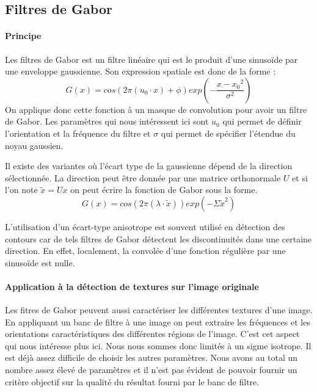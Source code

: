 \documentclass{article}
\begin{document}
\subsection{Filtres de Gabor}

\paragraph{Principe}

Les filtres de Gabor  est un filtre linéaire qui est le produit d'une sinusoïde 
par une enveloppe gaussienne. Son expression spatiale est donc de la forme :
$$ G(x)= cos(2 \pi (u_0 \cdot x) + \phi) exp\left(-\frac{{x-x_0}^2}{\sigma^2}\right) $$
On applique donc cette fonction à un masque de convolution pour avoir un filtre de Gabor.
Les paramètres qui nous intéressent ici sont $u_0$ qui permet de définir l'orientation et la fréquence du filtre et $\sigma$ qui permet de spécifier l'étendue du noyau gaussien. 

Il existe des variantes où l'écart type de la gaussienne dépend de la direction sélectionnée. 
La direction peut être donnée par une matrice orthonormale $U$ et si l'on note $\tilde{x} = U x$ on peut écrire la fonction de Gabor sous la forme.
$$ G(x)= cos(2 \pi (\lambda \cdot \tilde{x}) ) exp\left(- {\Sigma \tilde{x}}^2 \right) $$

L'utilisation d'un écart-type anisotrope est souvent utilisé en détection des contours car de tels filtres de Gabor détectent les discontinuités dans une certaine direction. En effet, localement, la convolée d'une fonction régulière par une sinusoïde est nulle.

\paragraph{Application à la détection de textures sur l'image originale}

Les fitres de Gabor peuvent aussi  caractériser les différentes textures d'une image. En appliquant un banc de filtre à une image on peut extraire les fréquences et les orientations caractéristiques des différentes régions de l'image. C'est cet aspect qui nous intéresse plus ici. Nous nous sommes donc limités à un sigme isotrope. Il est déjà assez difficile de choisir les autres paramètres. Nous avons au total un nombre assez élevé de paramètres et il n'est pas évident de pouvoir fournir un critère objectif sur la qualité du résultat fourni par le banc de filtre.
\end{document}
